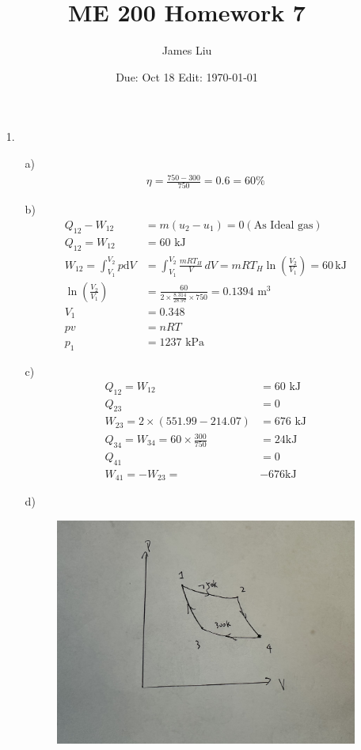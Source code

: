 \documentclass{article}
\date{Due: Oct 18  Edit: \today}
\title{ME 200 Homework 7}
\author{James Liu}
\begin{document}
\maketitle
\begin{itemize}
    \item [1.] 
    \begin{itemize}
        \item [a)]     
        \begin{align*}
            \eta = \frac{750-300}{750} = 0.6 = 60\%
        \end{align*}
        \item [b)]
        \begin{align*}
            Q_{12}-W_{12} &= m(u_2-u_1) = 0 (\text{As Ideal gas})\\
            Q_{12}=W_{12} &= 60\text{ kJ}\\
            W_{12} = \int_{V_1}^{V_2} p \text{d}V &= \int_{V_1}^{V_2} \frac{mRT_H}{V} \, dV = mRT_H \ln \left( \frac{V_2}{V_1} \right) = 60 \, \text{kJ}\\
            \ln \left( \frac{V_2}{V_1} \right) &= \frac{60}{2 \times \frac{8.314}{28.97} \times 750}= 0.1394 \text{ m}^3
            \\ V_1 &= 0.348\\
            pv &=nRT\\
            p_1 &= 1237 \text{ kPa} 
        \end{align*}
        \item [c)]
        \begin{align*}
            Q_{12}=W_{12} &= 60\text{ kJ}\\
            Q_{23}&=0\\
            W_{23}=2\times (551.99-214.07)&=676 \text{ kJ}\\
            Q_{34}=W_{34}=60\times \frac{300}{750} &= 24 \text{kJ}\\
            Q_{41}&=0\\
            W_{41}=-W_23=&-676 \text{{kJ}}
        \end{align*}
        \item [d)] \ 
        \begin{figure}[h]
            \centering
            \includegraphics[scale=0.1]{fig/me200-hw6-fig1}

\end{figure}
\end{itemize}
\end{itemize}
\end{document}
